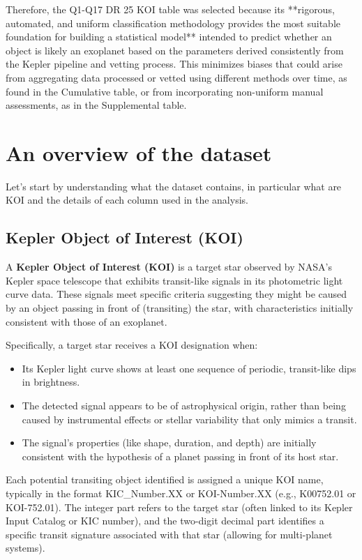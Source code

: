 Therefore, the Q1-Q17 DR 25 KOI table was selected because its **rigorous, automated, and uniform classification methodology provides the most suitable foundation for building a statistical model** intended to predict whether an object is likely an exoplanet based on the parameters derived consistently from the Kepler pipeline and vetting process. This minimizes biases that could arise from aggregating data processed or vetted using different methods over time, as found in the Cumulative table, or from incorporating non-uniform manual assessments, as in the Supplemental table.

\section{An overview of the dataset}
Let's start by understanding what the dataset contains, in particular what are KOI and the details of each column used in the analysis.

\subsection{Kepler Object of Interest (KOI)}
A \textbf{Kepler Object of Interest (KOI)} is a target star observed by NASA's Kepler space telescope that exhibits transit-like signals in its photometric light curve data. These signals meet specific criteria suggesting they might be caused by an object passing in front of (transiting) the star, with characteristics initially consistent with those of an exoplanet.

Specifically, a target star receives a KOI designation when:
\begin{itemize}
    \item Its Kepler light curve shows at least one sequence of periodic, transit-like dips in brightness.
    \item The detected signal appears to be of astrophysical origin, rather than being caused by instrumental effects or stellar variability that only mimics a transit.
    \item The signal's properties (like shape, duration, and depth) are initially consistent with the hypothesis of a planet passing in front of its host star.
\end{itemize}

Each potential transiting object identified is assigned a unique KOI name, typically in the format KIC\_Number.XX or KOI-Number.XX (e.g., K00752.01 or KOI-752.01). The integer part refers to the target star (often linked to its Kepler Input Catalog or KIC number), and the two-digit decimal part identifies a specific transit signature associated with that star (allowing for multi-planet systems).

